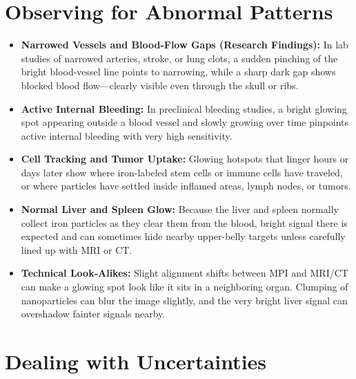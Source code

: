 \section{Observing for Abnormal Patterns}

\begin{itemize}
    \item \textbf{Narrowed Vessels and Blood-Flow Gaps (Research Findings):} In lab studies of narrowed arteries, stroke, or lung clots, a sudden pinching of the bright blood-vessel line points to narrowing, while a sharp dark gap shows blocked blood flow---clearly visible even through the skull or ribs.
    \item \textbf{Active Internal Bleeding:} In preclinical bleeding studies, a bright glowing spot appearing outside a blood vessel and slowly growing over time pinpoints active internal bleeding with very high sensitivity.
    \item \textbf{Cell Tracking and Tumor Uptake:} Glowing hotspots that linger hours or days later show where iron-labeled stem cells or immune cells have traveled, or where particles have settled inside inflamed areas, lymph nodes, or tumors.
    \item \textbf{Normal Liver and Spleen Glow:} Because the liver and spleen normally collect iron particles as they clear them from the blood, bright signal there is expected and can sometimes hide nearby upper-belly targets unless carefully lined up with MRI or CT.
    \item \textbf{Technical Look-Alikes:} Slight alignment shifts between MPI and MRI/CT can make a glowing spot look like it sits in a neighboring organ. Clumping of nanoparticles can blur the image slightly, and the very bright liver signal can overshadow fainter signals nearby.
\end{itemize}

\section{Dealing with Uncertainties}


